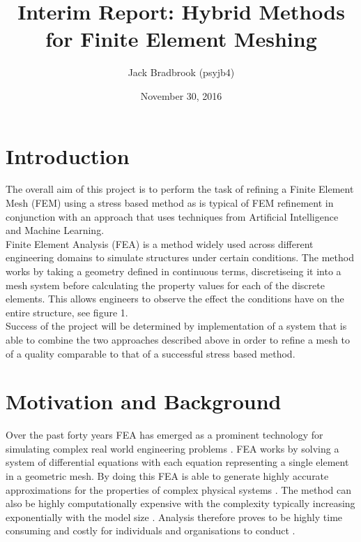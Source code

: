\documentclass{article}
\begin{document}

\title{Interim Report: Hybrid Methods for Finite Element Meshing}
\author{Jack Bradbrook (psyjb4)}
\date{November 30, 2016}
\maketitle

\tableofcontents

\newpage

\section{Introduction}

The overall aim of this project is to perform the task of refining a Finite Element Mesh (FEM) using a stress based method as is typical of FEM refinement in conjunction with an approach that uses techniques from Artificial Intelligence and Machine Learning. \\

\noindent
Finite Element Analysis (FEA) is a method widely used across different engineering domains to simulate structures under certain conditions. The method works by taking a geometry defined in continuous terms, discretiseing it into a mesh system before calculating the property values for each of the discrete elements. This allows engineers to observe the effect the conditions have on the entire structure, see figure 1. \\ 

\noindent
Success of the project will be determined by implementation of a system that is able to combine the two approaches described above in order to refine a mesh to of a quality comparable to that of a successful stress based method.


\section{Motivation and Background}

Over the past forty years FEA has emerged as a prominent technology for simulating complex real world engineering problems \cite{cite0, DolsakPaper94}. FEA works by solving a system of differential equations with each equation representing a single element in a geometric mesh. By doing this FEA is able to generate highly accurate approximations for the properties of complex physical systems \cite{DolsakPaper94} \cite{IntroductionToFE}. The method can also be highly computationally expensive with the complexity typically increasing exponentially with the model size \cite{DolsakPaper94}. Analysis therefore proves to be highly time consuming and costly for individuals and organisations to conduct \cite{ConsultRuleIntelltSystemFE}. \cite{cite03}\\
\end{document}
